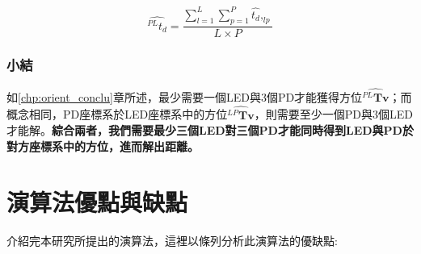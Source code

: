         \begin{equation}
            \label{eqn:average_dis}
            \hat{^{PL}t_d }= \frac{\sum^{L}_{l=1}\sum^{P}_{p=1} \hat{t_d },_{lp} }{L\times P}
        \end{equation}

        \subsubsection{小結}

        如\ref{chp:orient_conclu}章所述，最少需要一個LED與3個PD才能獲得方位$\hat{{^{PL}\boldsymbol{Tv}}}$；而概念相同，PD座標系於LED座標系中的方位$\hat{{^{LP}\boldsymbol{Tv}}}$，則需要至少一個PD與3個LED才能解。\textbf{綜合兩者，我們需要最少三個LED對三個PD才能同時得到LED與PD於對方座標系中的方位，進而解出距離。}


\section{演算法優點與缺點}
\label{chp:algorithm_ad_dis}


介紹完本研究所提出的演算法，這裡以條列分析此演算法的優缺點:


